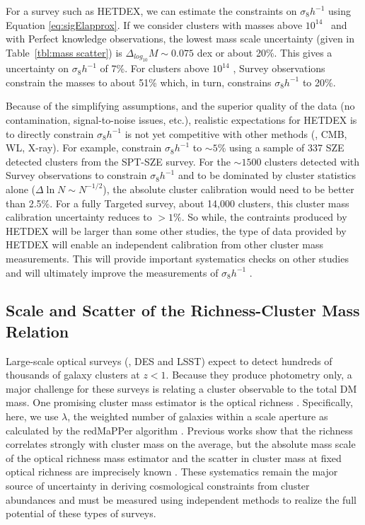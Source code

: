 \documentclass[fleqn,usenatbib]{mnras}
\begin{document}
For a survey such as HETDEX, we can estimate the constraints on $\sigma_8h^{-1}$ using Equation \ref{eq:sigElapprox}. If we consider clusters with masses above $10^{14}$ \Msol\ and with Perfect knowledge observations, the lowest mass scale uncertainty (given in Table~\ref{tbl:mass scatter}) is $\Delta_{log_{10}}M \sim 0.075$ dex or about 20\%. This gives a uncertainty on $\sigma_8h^{-1}$ of 7\%. For clusters above $10^{14}$ \Msol, Survey observations constrain the masses to about 51\% which, in turn, constrains $\sigma_8h^{-1}$ to 20\%.

Because of the simplifying assumptions, and the superior quality of the data (no contamination, signal-to-noise issues, etc.), realistic expectations for HETDEX is to directly constrain $\sigma_8h^{-1}$ is not yet competitive with other methods (\eg, CMB, WL, X-ray). For example, \cite{DeHaan2016} constrain $\sigma_8h^{-1}$ to $\sim5$\% using a sample of 337 SZE detected clusters from the SPT-SZE survey. For the $\sim1500$ clusters detected with Survey observations to constrain $\sigma_8h^{-1}$ and to be dominated by cluster statistics alone ($\Delta \ln N \sim N^{-1/2}$), the absolute cluster calibration would need to be better than 2.5\%. For a fully Targeted survey, about 14,000 clusters, this cluster mass calibration uncertainty reduces to $>1\%$. So while, the contraints produced by HETDEX will be larger than some other studies, the type of data provided by HETDEX will enable an independent calibration from other cluster mass measurements. This will provide important systematics checks on other studies and will ultimately improve the measurements of $\sigma_8h^{-1}$ .

\subsection{Scale and Scatter of the Richness-Cluster Mass Relation}
Large-scale optical surveys (\eg, DES and LSST) expect to detect hundreds of thousands of galaxy clusters at $z < 1$. Because they produce photometry only, a major challenge for these surveys is relating a cluster observable to the total DM mass. One promising cluster mass estimator is the optical richness . Specifically, here, we use $\lambda$, the weighted number of galaxies within a scale aperture  as calculated by the redMaPPer algorithm \citep{Rykoff2012}. Previous works  show that the richness correlates strongly with cluster mass on the average, but the absolute mass scale of the optical richness mass estimator and the scatter in cluster mass at fixed optical richness are imprecisely known \citep{Rykoff2012}. These systematics remain the major source of uncertainty in deriving cosmological constraints from cluster abundances and must be measured using independent methods to realize the full potential of these types of surveys.
\end{document}

